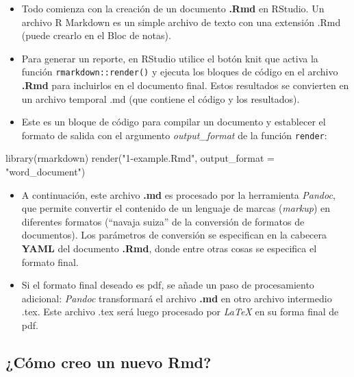 \documentclass[
]{article}
\newenvironment{Shaded}{\begin{snugshade}}{\end{snugshade}}
\newcommand{\AttributeTok}[1]{\textcolor[rgb]{0.77,0.63,0.00}{#1}}
\newcommand{\FunctionTok}[1]{\textcolor[rgb]{0.00,0.00,0.00}{#1}}
\newcommand{\NormalTok}[1]{#1}
\newcommand{\StringTok}[1]{\textcolor[rgb]{0.31,0.60,0.02}{#1}}
\begin{document}
\begin{itemize}
\item
  Todo comienza con la creación de un documento \textbf{.Rmd} en
  RStudio. Un archivo R Markdown es un simple archivo de texto con una
  extensión .Rmd (puede crearlo en el Bloc de notas).
\item
  Para generar un reporte, en RStudio utilice el botón knit que activa
  la función \texttt{rmarkdown::render()} y ejecuta los bloques de
  código en el archivo \textbf{.Rmd} para incluirlos en el documento
  final. Estos resultados se convierten en un archivo temporal .md (que
  contiene el código y los resultados).
\item
  Este es un bloque de código para compilar un documento y establecer el
  formato de salida con el argumento \emph{output\_format} de la función
  \texttt{render}:
\end{itemize}

\begin{Shaded}
\begin{Highlighting}[]
\FunctionTok{library}\NormalTok{(rmarkdown)}
\FunctionTok{render}\NormalTok{(}\StringTok{"1{-}example.Rmd"}\NormalTok{, }\AttributeTok{output\_format =} \StringTok{"word\_document"}\NormalTok{) }
\end{Highlighting}
\end{Shaded}

\begin{itemize}
\item
  A continuación, este archivo \textbf{.md} es procesado por la
  herramienta \emph{Pandoc}, que permite convertir el contenido de un
  lenguaje de marcas (\emph{markup}) en diferentes formatos (``navaja
  suiza'' de la conversión de formatos de documentos). Los parámetros de
  conversión se especifican en la cabecera \textbf{YAML} del documento
  \textbf{.Rmd}, donde entre otras cosas se especifica el formato final.
\item
  Si el formato final deseado es pdf, se añade un paso de procesamiento
  adicional: \emph{Pandoc} transformará el archivo \textbf{.md} en otro
  archivo intermedio .tex. Este archivo .tex será luego procesado por
  \emph{LaTeX} en su forma final de pdf.
\end{itemize}

\hypertarget{cuxf3mo-creo-un-nuevo-rmd}{%
\subsection*{¿Cómo creo un nuevo Rmd?}\label{cuxf3mo-creo-un-nuevo-rmd}}
\end{document}
